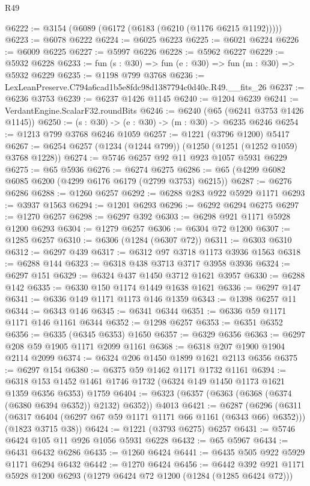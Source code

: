 \begin{lexlean}{R49}
\begin{coremodule}
@6222 := @3154 (@6089 (@6172 (@6183 (@6210 (@1176 @6215 @1192)))))
@6223 := @6078 @6222
@6224 := @6025 @6223
@6225 := @6021 @6224
@6226 := @6009 @6225
@6227 := @5997 @6226
@6228 := @5962 @6227
@6229 := @5932 @6228
@6233 := fun (s : @30) => fun (e : @30) => fun (m : @30) => @5932 @6229
@6235 := @1198 @799 @3768
@6236 := LexLeanPreserve.C794a6cad1b5e8fdc98d1387794c0d40c.R49.__fits_26
@6237 := @6236 @3753
@6239 := @6237 @1426 @1145
@6240 := @1204 @6239
@6241 := VerdantEngine.ScalarF32.roundBits
@6246 := @6240 (@65 (@6241 @3753 @1426 @1145))
@6250 := (s : @30) -> (e : @30) -> (m : @30) -> @6235 @6246
@6254 := @1213 @799 @3768 @6246 @1059
@6257 := @1221 (@3796 @1200) @5417
@6267 := @6254 @6257 (@1234 (@1244 @799)) (@1250 (@1251 (@1252 @1059) @3768 @1228))
@6274 := @5746 @6257 @92 @11 @923 @1057 @5931 @6229
@6275 := @65 @5936
@6276 := @6274 @6275
@6286 := @65 (@4299 @6082 @6085 @6200 (@4299 @6176 @6179 (@2799 @3753) @6215))
@6287 := @6276 @6286
@6288 := @1260 @6257
@6292 := @6288 @283 @922 @5929 @1171
@6293 := @3937 @1563
@6294 := @1201 @6293
@6296 := @6292 @6294 @6275
@6297 := @1270 @6257
@6298 := @6297 @392
@6303 := @6298 @921 @1171 @5928 @1200 @6293
@6304 := @1279 @6257
@6306 := @6304 @72 @1200
@6307 := @1285 @6257
@6310 := @6306 (@1284 (@6307 @72))
@6311 := @6303 @6310
@6312 := @6297 @439
@6317 := @6312 @97 @3718 @1173 @3936 @1563
@6318 := @6288 @144
@6323 := @6318 @438 @3713 @3717 @3958 @3936
@6324 := @6297 @151
@6329 := @6324 @437 @1450 @3712 @1621 @3957
@6330 := @6288 @142
@6335 := @6330 @150 @1174 @1449 @1638 @1621
@6336 := @6297 @147
@6341 := @6336 @149 @1171 @1173 @146 @1359
@6343 := @1398 @6257 @11
@6344 := @6343 @146
@6345 := @6341 @6344
@6351 := @6336 @59 @1171 @1171 @146 @1161 @6344
@6352 := @1298 @6257
@6353 := @6351 @6352
@6356 := @6335 (@6345 @6353) @1650
@6357 := @6329 @6356
@6363 := @6297 @208 @59 @1905 @1171 @2099 @1161
@6368 := @6318 @207 @1900 @1904 @2114 @2099
@6374 := @6324 @206 @1450 @1899 @1621 @2113 @6356
@6375 := @6297 @154
@6380 := @6375 @59 @1462 @1171 @1732 @1161
@6394 := @6318 @153 @1452 @1461 @1746 @1732 (@6324 @149 @1450 @1173 @1621 @1359 @6356 @6353) @1759
@6404 := @6323 (@6357 (@6363 (@6368 (@6374 (@6380 @6394 @6352)) @2132) @6352)) @4013
@6421 := @6287
    (@6296
      (@6311 (@6317 @6404 (@6297 @67 @59 @1171 @1171 @66 @1161 (@6343 @66) @6352)))
      (@1823 @3715 @38))
@6424 := @1221 (@3793 @6275) @6257
@6431 := @5746 @6424 @105 @11 @926 @1056 @5931 @6228
@6432 := @65 @5967
@6434 := @6431 @6432 @6286
@6435 := @1260 @6424
@6441 := @6435 @505 @922 @5929 @1171 @6294 @6432
@6442 := @1270 @6424
@6456 := @6442 @392 @921 @1171 @5928 @1200 @6293 (@1279 @6424 @72 @1200 (@1284 (@1285 @6424 @72)))

\end{coremodule}
\end{lexlean}

